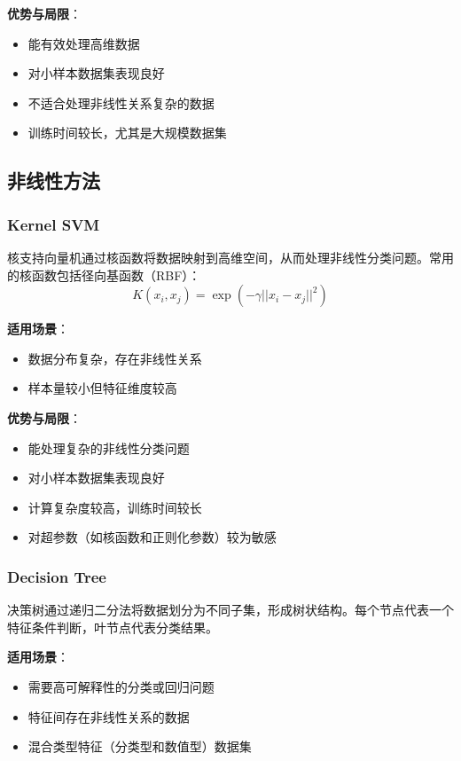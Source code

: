 \documentclass{article}
\begin{document}
\textbf{优势与局限}：
\begin{itemize}
    \item 能有效处理高维数据
    \item 对小样本数据集表现良好
    \item 不适合处理非线性关系复杂的数据
    \item 训练时间较长，尤其是大规模数据集
\end{itemize}

\subsection{非线性方法}
\subsubsection{Kernel SVM}
核支持向量机通过核函数将数据映射到高维空间，从而处理非线性分类问题。常用的核函数包括径向基函数（RBF）：
\begin{equation}
K(x_i, x_j) = \exp(-\gamma ||x_i - x_j||^2)
\end{equation}

\textbf{适用场景}：
\begin{itemize}
    \item 数据分布复杂，存在非线性关系
    \item 样本量较小但特征维度较高
\end{itemize}

\textbf{优势与局限}：
\begin{itemize}
    \item 能处理复杂的非线性分类问题
    \item 对小样本数据集表现良好
    \item 计算复杂度较高，训练时间较长
    \item 对超参数（如核函数和正则化参数）较为敏感
\end{itemize}

\subsubsection{Decision Tree}
决策树通过递归二分法将数据划分为不同子集，形成树状结构。每个节点代表一个特征条件判断，叶节点代表分类结果。

\textbf{适用场景}：
\begin{itemize}
    \item 需要高可解释性的分类或回归问题
    \item 特征间存在非线性关系的数据
    \item 混合类型特征（分类型和数值型）数据集
\end{itemize}
\end{document}
